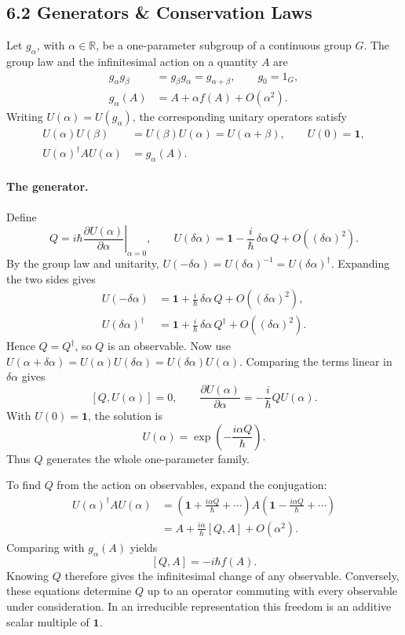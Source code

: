 \documentclass[11pt,a4paper]{article}
\begin{document}
\subsection*{6.2 Generators \& Conservation Laws}

Let $g_\alpha$, with $\alpha\in\mathbb R$, be a one-parameter subgroup
of a continuous group $G$. The group law and the infinitesimal action
on a quantity $A$ are
\begin{align*}
    g_\alpha g_\beta &= g_\beta g_\alpha = g_{\alpha+\beta},
    \qquad g_0=1_G,\\
    g_\alpha(A) &= A+\alpha f(A)+O(\alpha^2).
\end{align*}
Writing $U(\alpha)=U(g_\alpha)$, the corresponding unitary operators
satisfy
\begin{align*}
    U(\alpha)U(\beta) &= U(\beta)U(\alpha)=U(\alpha+\beta),
    \qquad U(0)=\mathbf 1,\\
    U(\alpha)^\dagger A U(\alpha)&=g_\alpha(A).
\end{align*}

\paragraph{The generator.}
Define
\[
    Q=i\hbar\left.\frac{\partial U(\alpha)}{\partial\alpha}\right|_{\alpha=0},
    \qquad
    U(\delta\alpha)=\mathbf 1-\frac{i}{\hbar}\,\delta\alpha\, Q
        +O((\delta\alpha)^2).
\]
By the group law and unitarity, $U(-\delta\alpha)=U(\delta\alpha)^{-1}
=U(\delta\alpha)^\dagger$. Expanding the two sides gives
\begin{align*}
    U(-\delta\alpha)
        &=\mathbf 1+\frac{i}{\hbar}\,\delta\alpha\, Q
            +O((\delta\alpha)^2),\\
    U(\delta\alpha)^\dagger
        &=\mathbf 1+\frac{i}{\hbar}\,\delta\alpha\, Q^\dagger
            +O((\delta\alpha)^2).
\end{align*}
Hence $Q=Q^\dagger$, so $Q$ is an observable. Now use
$U(\alpha+\delta\alpha)=U(\alpha)U(\delta\alpha)
=U(\delta\alpha)U(\alpha)$. Comparing the terms linear in $\delta\alpha$
gives
\[
    [Q,U(\alpha)]=0,
    \qquad
    \frac{\partial U(\alpha)}{\partial\alpha}
        =-\frac{i}{\hbar}Q U(\alpha).
\]
With $U(0)=\mathbf 1$, the solution is
\[
    U(\alpha)=\exp\!\left(-\frac{i\alpha Q}{\hbar}\right).
\]
Thus $Q$ generates the whole one-parameter family.

To find $Q$ from the action on observables, expand the conjugation:
\begin{align*}
    U(\alpha)^\dagger A U(\alpha)
        &=\left(\mathbf 1+\frac{i\alpha Q}{\hbar}+\cdots\right)
          A\left(\mathbf 1-\frac{i\alpha Q}{\hbar}+\cdots\right)\\
        &=A+\frac{i\alpha}{\hbar}[Q,A]+O(\alpha^2).
\end{align*}
Comparing with $g_\alpha(A)$ yields
\[
    [Q,A]=-i\hbar f(A).
\]
Knowing $Q$ therefore gives the infinitesimal change of any observable.
Conversely, these equations determine $Q$ up to an operator commuting
with every observable under consideration. In an irreducible
representation this freedom is an additive scalar multiple of $\mathbf 1$.
\end{document}
